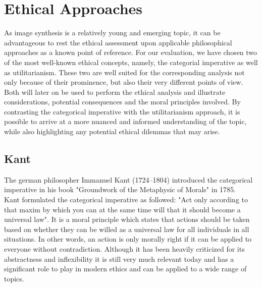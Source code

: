 \documentclass[10pt,twocolumn,twoside]{osajnl}
\begin{document}
\section{Ethical Approaches}
As image synthesis is a relatively young and emerging topic, it can be advantageous to rest the ethical assessment upon applicable philosophical approaches as a known point of reference.
For our evaluation, we have chosen two of the most well-known ethical concepts, namely, the categorial imperative as well as utilitarianism. These two are well suited for the corresponding analysis not only because of their prominence, but also their 
very different points of view.\\
Both will later on be used to perform the ethical analysis and illustrate considerations, potential consequences and the moral principles involved.
By contrasting the categorical imperative with the utilitarianism approach, it is possible to arrive at a more nuanced and informed understanding of the topic, while also highlighting any potential ethical dilemmas that may arise.

\subsection{Kant}
The german philosopher Immanuel Kant (1724--1804) introduced the categorical imperative in his book "Groundwork of the Metaphysic of Morals" in 1785. \\
Kant formulated the categorical imperative as followed: "Act only according to that maxim by which you can at the same time will that it should become a universal law". 
It is a moral principle which states that actions should be taken based on whether they can be willed as a universal law for all individuals in all situations. 
In other words, an action is only morally right if it can be applied to everyone without contradiction.
Although it has been heavily criticized for its abstractness and inflexibility it is still very much relevant today and has a significant role to play in modern ethics and can be applied to a wide range of topics. %
\end{document}
